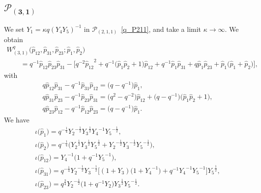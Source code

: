\documentclass[pdftex]{sigma}
\numberwithin{equation}{section}
\begin{document}
\subsection[$\mathcal{P}_{(3,1)}$]{$\boldsymbol{\mathcal{P}_{(3,1)}}$}
We set $Y_1 = \kappa q (Y_4 Y_5)^{-1}$ in $\mathcal{P}_{(2,1,1)}$~\eqref{q_P211}, and take a limit $\kappa\to\infty$. We obtain
\begin{gather*}
 W^q_{(3,1)}\big(\hat{p}_{12}, \hat{p}_{31}, \hat{p}_{23} ; \hat{p}_1, \hat{p}_2\big) \\
\qquad{} = q^{-1} \hat{p}_{12} \hat{p}_{23} \hat{p}_{31} - \big[ q^{-2} {\hat{p}_{12}}^{2} + q^{-1} \big( \hat{p}_1 \hat{p}_2 + 1 \big) \hat{p}_{12} + q^{-1} \hat{p}_1 \hat{p}_{31} + q \hat{p}_1 \hat{p}_{23}
 + \hat{p}_1 \big( \hat{p}_1 + \hat{p}_2 \big) \big],
\end{gather*}
with
\begin{gather*}
q \hat{p}_{12} \hat{p}_{31} - q^{-1} \hat{p}_{31} \hat{p}_{12} = \big(q - q^{-1} \big) \hat{p}_1 , \\
q \hat{p}_{31} \hat{p}_{23} - q^{-1} \hat{p}_{23} \hat{p}_{31} = \big( q^2 - q^{-2} \big) \hat{p}_{12} + \big(q-q^{-1}\big) \big( \hat{p}_1 \hat{p}_2 + 1 \big) , \\
q \hat{p}_{23} \hat{p}_{12} - q^{-1} \hat{p}_{12} \hat{p}_{23} = \big( q-q^{-1} \big) \hat{p}_1 .
\end{gather*}
We have
\begin{gather}
\iota\big(\hat{p}_1\big) = q^{-\frac{1}{4}} {Y_2}^{-\frac{1}{2}} {Y_3}^{\frac{1}{2}} {Y_4}^{-1} {Y_5}^{-\frac{1}{2}} , \nonumber\\
 \iota\big(\hat{p}_2\big) = q^{-\frac{1}{4}} \big( {Y_2}^{\frac{1}{2}} {Y_3}^{\frac{1}{2}} {Y_5}^{\frac{1}{2}} + {Y_2}^{-\frac{1}{2}} {Y_3}^{-\frac{1}{2}} {Y_5}^{-\frac{1}{2}} \big), \nonumber\\
 \iota\big(\hat{p}_{12}\big) = {Y_4}^{-1} \big( 1 + q^{-1} {Y_5}^{-1} \big) ,\nonumber \\
 \iota\big(\hat{p}_{31}\big) = q^{-\frac{1}{4}} {Y_2}^{-\frac{1}{2}} {Y_3}^{-\frac{1}{2}} \big[ ( 1+Y_3)\big(1+ {Y_4}^{-1} \big) + q^{-1} {Y_4}^{-1} {Y_5}^{-1} \big] {Y_5}^{\frac{1}{2}} ,\nonumber \\
 \iota\big(\hat{p}_{23}\big) = q^{\frac{3}{4}} {Y_2}^{-\frac{1}{2}} \big( 1 + q^{-1} Y_2 \big) {Y_3}^{\frac{1}{2}} {Y_5}^{-\frac{1}{2}} . \label{q_P31}
\end{gather}
\end{document}
